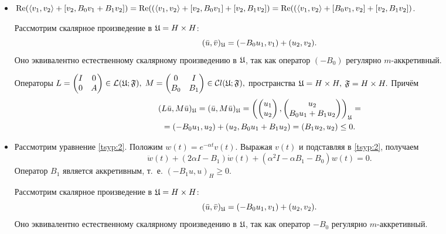 \begin{itemize}
\item[(i)] $\mathop{\rm Re}(\langle v_{1},v_{2}\rangle+[v_{2},B_{0}v_{1}+B_{1}v_{2}])=
\mathop{\rm Re}((\langle v_{1},v_{2}\rangle+[v_{2},B_{0}v_{1}]+[v_{2},B_{1}v_{2}])=
\mathop{\rm Re}((\langle v_{1},v_{2}\rangle+[B_{0}v_{1},v_{2}]+[v_{2},B_{1}v_{2}])$.

Рассмотрим скалярное произведение в $\frak U=H\times H$:
$$(\bar{u},\bar{v})_{\frak U}=(-B_{0}u_{1},v_{1})+(u_{2},v_{2}).$$
Оно эквивалентно естественному скалярному произведению в
$\frak{U}$, так как оператор $(-B_{0})$ регулярно $m$-аккретивный.

Операторы $L=\begin{pmatrix} I&0\\0&A\end{pmatrix}\in\mathcal L
(\frak U;\frak F),$ $M=\begin{pmatrix}
0&I\\B_{0}&B_{1}\end{pmatrix}\in\mathcal Cl (\frak U;\frak F),$
пространства $\frak U=H\times  H,$ $\frak F= H\times  H.$ Причём
\begin{multline*}
(L\bar{u},M\bar{u})_{\frak U}=  (\bar{u},M\bar{u})_{\frak U}=
\left(\begin{pmatrix}u_{1}\\u_{2}\end{pmatrix},\begin{pmatrix}u_{2}\\B_{0}u_{1}+B_{1}u_{2}\end{pmatrix}\right)_{\frak U}=
\\
=(-B_{0}u_{1},u_{2})+(u_{2},B_{0}u_{1}+B_{1}u_{2})=(B_{1}u_{2},u_{2})\leq 0.
\end{multline*}

\item[(ii)] Рассмотрим уравнение \eqref{tsyp:2}. Положим $w(t)=e^{-\alpha t}
v(t).$ Выражая $v(t)$ и подставляя в \eqref{tsyp:2}, получаем
$$\ddot{w}(t)+(2\alpha I-B_{1})\dot{w}(t)+(\alpha^{2}I-\alpha
B_{1}-B_{0})w(t)=0.$$ Оператор $B_{1}$ является аккретивным, т.~е.
$(-B_{1}u,u)_{H}\geq 0$.

Рассмотрим скалярное произведение в $\frak U=H\times H$:
$$(\bar{u},\bar{v})_{\frak U}=(-B_{0}u_{1},v_{1})+(u_{2},v_{2}).$$
Оно эквивалентно естественному скалярному произведению в
$\frak{U}$, так как оператор $-B_{0}$ регулярно $m$-аккретивный.


\end{itemize}
